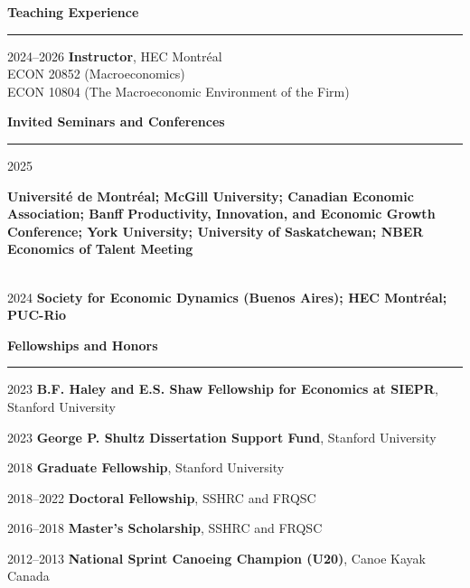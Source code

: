 \documentclass[12pt]{article}
\begin{document}
{\large \textbf{Teaching Experience}} \\
\noindent\rule[0.5\baselineskip]{\textwidth}{1pt}

\begin{small}
2024--2026 \tabto{3cm} \textbf{Instructor}, HEC Montr\'eal \\
\tabto{3cm} \hspace{0.25cm} ECON 20852 (Macroeconomics) \\
\tabto{3cm} \hspace{0.25cm} ECON 10804 (The Macroeconomic Environment of the Firm)
\end{small}

\vspace{0.5cm}

{\large \textbf{Invited Seminars and Conferences}} \\
\noindent\rule[0.5\baselineskip]{\textwidth}{1pt}

\begin{small}

2025 \tabto{3cm} \parbox[t]{13cm}{\textbf{Université de Montréal; McGill University; Canadian Economic Association; Banff Productivity, Innovation, and Economic Growth Conference; York University; University of Saskatchewan; NBER Economics of Talent Meeting}} \\

2024 \tabto{3cm} \textbf{Society for Economic
Dynamics (Buenos Aires); HEC Montr\'eal; PUC-Rio}

\end{small}

\vspace{0.5cm}

{\large \textbf{Fellowships and Honors}} \\
\noindent\rule[0.5\baselineskip]{\textwidth}{1pt}

\begin{small}

2023 \tabto{3cm} \textbf{B.F. Haley and E.S. Shaw Fellowship for Economics at SIEPR}, Stanford University

2023 \tabto{3cm} \textbf{George P. Shultz Dissertation Support Fund}, Stanford University

2018 \tabto{3cm} \textbf{Graduate Fellowship}, Stanford University

2018--2022 \tabto{3cm} \textbf{Doctoral Fellowship}, SSHRC and FRQSC

2016--2018 \tabto{3cm} \textbf{Master's Scholarship}, SSHRC and FRQSC

2012--2013 \tabto{3cm} \textbf{National Sprint Canoeing Champion (U20)}, Canoe Kayak Canada
\end{small}
\end{document}

